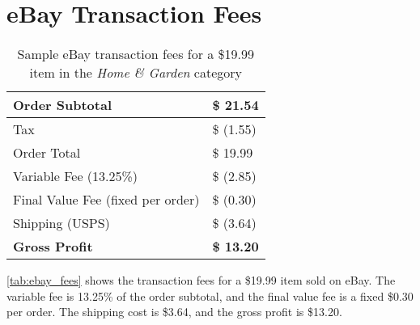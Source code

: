 \section{eBay Transaction Fees}
\label{appendix:ebay_fees}

\begin{table}[H]
	\caption{Sample eBay transaction fees for a \$19.99 item in the \textit{Home \& Garden} category}
		\begin{tabular}{l|l}
		Order   Subtotal                    & \$      21.54        \\ \hline
		Tax                                 & \$    (1.55)         \\
		Order Total                         & \$    19.99          \\ \hline
		Variable Fee (13.25\%)              & \$    (2.85)         \\
		Final Value Fee (fixed per order) & \$    (0.30)         \\
		Shipping (USPS)                     & \$    (3.64)         \\ \hline
		\textbf{Gross Profit}               & \textbf{\$    13.20}
		\end{tabular}
	\label{tab:ebay_fees}
\end{table}

\autoref{tab:ebay_fees} shows the transaction fees for a \$19.99 item sold on eBay. The variable fee is 13.25\% of the order subtotal, and the final value fee is a fixed \$0.30 per order. The shipping cost is \$3.64, and the gross profit is \$13.20.
